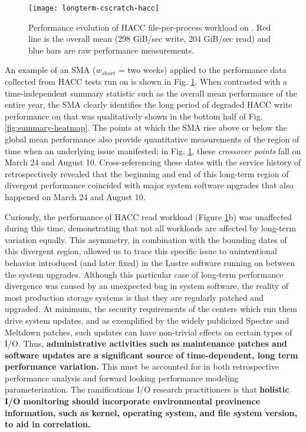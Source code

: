 \begin{figure}[t]
    \centering
    \texttt{[image: longterm-cscratch-hacc]}
    \vspace{-.35in}
    \caption{Performance evolution of HACC file-per-process workload on \cori.  Red line is the overall mean (298 GiB/sec write, 204 GiB/sec read) and blue bars are raw performance measurements.}
    \label{fig:timeseries-baseline}
\end{figure}


An example of an SMA ($w_{short}$ = two weeks) applied to the performance data collected from HACC tests run on \cori is shown in Fig. \ref{fig:timeseries-baseline}.
When contrasted with a time-independent summary statistic such as the overall mean performance of the entire year, the SMA clearly identifies the long period of degraded HACC write performance on \cori that was qualitatively shown in the bottom half of Fig. \ref{fig:summary-heatmap}.
The points at which the SMA rise above or below the global mean performance also provide quantitative measurements of the region of time when an underlying issue manifested;
in Fig. \ref{fig:timeseries-baseline}, these \emph{crossover points} fall on March 24 and August 10.
Cross-referencing these dates with the service history of \cori retrospectively revealed that the beginning and end of this long-term region of divergent performance coincided with major system software upgrades that also happened on March 24 and August 10.

Curiously, the performance of HACC read workload (Figure \ref{fig:timeseries-baseline}b) was unaffected during this time, demonstrating that not all workloads are affected by long-term variation equally.
This asymmetry, in combination with the bounding dates of this divergent region, allowed us to trace this specific issue to unintentional behavior introduced (and later fixed) in the Lustre software running on \cori between the system upgrades.
Although this particular case of long-term performance divergence was caused by an unexpected bug in system software, the reality of most production storage systems is that they are regularly patched and upgraded.
At minimum, the security requirements of the centers which run them drive system updates, and as exemplified by the widely publicized Spectre and Meltdown patches, such updates can have non-trivial effects on certain types of I/O.
Thus, \textbf{administrative activities such as maintenance patches and
software updates are a significant source of time-dependent, long term performance
variation.}  This must be accounted for in both retrospective performance
analysis and forward looking performance modeling parameterization.  The
ramifications I/O research practitioners is that \textbf{holistic I/O monitoring
should incorporate environmental provinence
information, such as kernel, operating system, and file
system version, to aid in correlation.}

